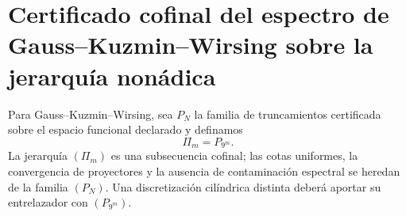 \section{Certificado cofinal del espectro de Gauss--Kuzmin--Wirsing sobre la jerarquía nonádica}
\label{sec:p3-final:cierre-gkw}

Para Gauss--Kuzmin--Wirsing, sea \(P_N\) la familia de truncamientos
certificada sobre el espacio funcional declarado y definamos
\[
 \Pi_m=P_{9^m}.
\]
La jerarquía \((\Pi_m)\) es una subsecuencia cofinal; las cotas uniformes, la
convergencia de proyectores y la ausencia de contaminación espectral se
heredan de la familia \((P_N)\). Una discretización cilíndrica distinta deberá
aportar su entrelazador con \((P_{9^m})\).
